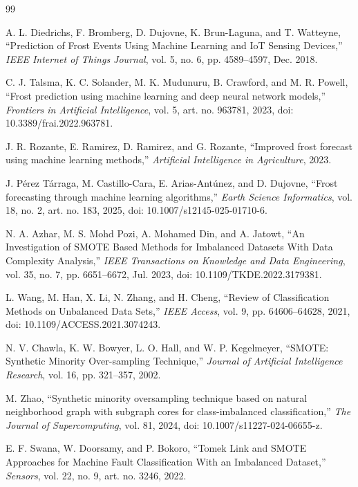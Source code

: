 \renewcommand{\refname}{Referencias Bibliográficas}
\begin{thebibliography}{99}

A. L. Diedrichs, F. Bromberg, D. Dujovne, K. Brun-Laguna, and T. Watteyne,
``Prediction of Frost Events Using Machine Learning and IoT Sensing Devices,''
\emph{IEEE Internet of Things Journal}, vol. 5, no. 6, pp. 4589--4597, Dec. 2018.

C. J. Talsma, K. C. Solander, M. K. Mudunuru, B. Crawford, and M. R. Powell,
``Frost prediction using machine learning and deep neural network models,''
\emph{Frontiers in Artificial Intelligence}, vol. 5, art. no. 963781, 2023,
doi: 10.3389/frai.2022.963781.

J. R. Rozante, E. Ramirez, D. Ramirez, and G. Rozante,
``Improved frost forecast using machine learning methods,''
\emph{Artificial Intelligence in Agriculture}, 2023.

J. Pérez Tárraga, M. Castillo-Cara, E. Arias-Antúnez, and D. Dujovne,
``Frost forecasting through machine learning algorithms,''
\emph{Earth Science Informatics}, vol. 18, no. 2, art. no. 183, 2025,
doi: 10.1007/s12145-025-01710-6.

N. A. Azhar, M. S. Mohd Pozi, A. Mohamed Din, and A. Jatowt,
``An Investigation of SMOTE Based Methods for Imbalanced Datasets With Data
Complexity Analysis,'' \emph{IEEE Transactions on Knowledge and Data
Engineering}, vol. 35, no. 7, pp. 6651--6672, Jul. 2023,
doi: 10.1109/TKDE.2022.3179381.

L. Wang, M. Han, X. Li, N. Zhang, and H. Cheng,
``Review of Classification Methods on Unbalanced Data Sets,''
\emph{IEEE Access}, vol. 9, pp. 64606--64628, 2021,
doi: 10.1109/ACCESS.2021.3074243.

N. V. Chawla, K. W. Bowyer, L. O. Hall, and W. P. Kegelmeyer,
``SMOTE: Synthetic Minority Over-sampling Technique,''
\emph{Journal of Artificial Intelligence Research}, vol. 16, pp. 321--357, 2002.

M. Zhao,
``Synthetic minority oversampling technique based on natural neighborhood graph
with subgraph cores for class-imbalanced classification,''
\emph{The Journal of Supercomputing}, vol. 81, 2024,
doi: 10.1007/s11227-024-06655-z.

E. F. Swana, W. Doorsamy, and P. Bokoro,
``Tomek Link and SMOTE Approaches for Machine Fault Classification With an
Imbalanced Dataset,'' \emph{Sensors}, vol. 22, no. 9, art. no. 3246, 2022.


\end{thebibliography}

